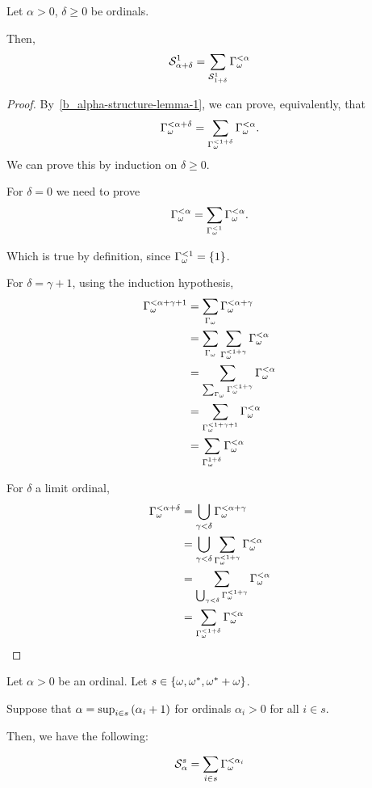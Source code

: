 \begin{corollary}
  Let $\alpha > 0$, $\delta \ge 0$ be ordinals.

  Then,
  \[
    \mathcal{S}^{1}_{\alpha + \delta}
    = \sum_{\mathcal{S}^{1}_{1 + \delta}}{\Gamma_{\omega}^{< \alpha}}
  \]
\end{corollary}

\begin{proof}
  By~\cref{b_alpha-structure-lemma-1}, we can prove, equivalently,
  that
  \[
    \Gamma_{\omega}^{< \alpha + \delta} = \sum_{\Gamma_{\omega}^{< 1 + \delta}}{\Gamma_{\omega}^{< \alpha}}.
  \]
  We can prove this by induction on $\delta \ge 0$.

  For $\delta = 0$ we need to prove
  \[
    \Gamma_{\omega}^{< \alpha} = \sum_{\Gamma_{\omega}^{< 1}}{\Gamma_{\omega}^{< \alpha}}.
  \]

  Which is true by definition, since $\Gamma_{\omega}^{< 1} = \left\{ {1} \right\}$. 

  For $\delta = \gamma + 1$, using the induction hypothesis,
  \[
    \begin{aligned}
      \Gamma_{\omega}^{< \alpha + \gamma + 1}
       & = \sum_{\Gamma_{\omega}}{\Gamma_{\omega}^{< \alpha + \gamma}}                    \\
       & = \sum_{\Gamma_{\omega}}{\sum_{\Gamma_{\omega}^{< 1 + \gamma}}{\Gamma_{\omega}^{< \alpha}}} \\
       & = \sum_{\sum_{\Gamma_{\omega}}{\Gamma_{\omega}^{< 1 + \gamma}}}{\Gamma_{\omega}^{< \alpha}} \\
       & = \sum_{\Gamma_{\omega}^{< 1 + \gamma + 1}}{\Gamma_{\omega}^{< \alpha}}          \\
       & = \sum_{\Gamma_{\omega}^{1 + \delta}}{\Gamma_{\omega}^{< \alpha}}
    \end{aligned}
  \]

  For $\delta$ a limit ordinal,
  \[
    \begin{aligned}
      \Gamma_{\omega}^{< \alpha + \delta}
       & = \bigcup_{\gamma < \delta}{\Gamma_{\omega}^{< \alpha + \gamma}} \\
       & = \bigcup_{\gamma < \delta}{\sum_{\Gamma_{\omega}^{< 1 + \gamma}}{\Gamma_{\omega}^{< \alpha}}} \\
       & = \sum_{\bigcup_{\gamma < \delta}{\Gamma_{\omega}^{< 1 + \gamma}}}{\Gamma_{\omega}^{< \alpha}} \\
       & = \sum_{\Gamma_{\omega}^{< 1 + \delta}}{\Gamma_{\omega}^{< \alpha}}
    \end{aligned}
  \]

\end{proof}

\begin{lemma}\label{b_alpha-structure-lemma-2}
  Let $\alpha > 0$ be an ordinal.
  Let $s \in \left\{ {\omega, \omega^\ast, \omega^\ast + \omega} \right\}$.

  Suppose that
  $\alpha = \sup_{i \in s} \left( {\alpha_i + 1} \right)$ for
  ordinals $\alpha_i > 0$ for all $i \in s$.

  Then, we have the following:

  \[
    \mathcal{S}^{s}_{\alpha} = \sum_{i \in s}{\Gamma_{\omega}^{< \alpha_i}}
  \]
\end{lemma}

